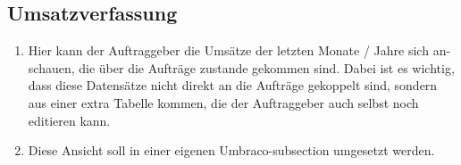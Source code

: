 \subsection{Umsatzverfassung}
\begin{enumerate}
	\item Hier kann der Auftraggeber die Umsätze der letzten Monate / Jahre sich an-schauen, die über die Aufträge zustande gekommen sind. Dabei ist es wichtig, dass diese Datensätze nicht direkt an die Aufträge gekoppelt sind, sondern aus einer extra Tabelle kommen, die der Auftraggeber auch selbst noch editieren kann.
	\item Diese Ansicht soll in einer eigenen Umbraco-subsection umgesetzt werden.
\end{enumerate} 


